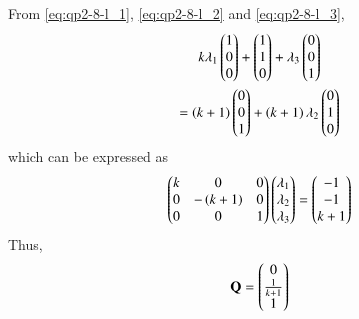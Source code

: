 \documentclass[journal,12pt,twocolumn]{IEEEtran}
\renewcommand\thesection{\arabic{section}}
\begin{document}
\begin{enumerate}[label=\thesection.\arabic*
,ref=\thesection.\theenumi]
From \eqref{eq:qp2-8-l_1}, \eqref{eq:qp2-8-l_2} and \eqref{eq:qp2-8-l_3},
\begin{multline}
k \lambda_1 \begin{pmatrix}1\\0\\0\end{pmatrix}
+\begin{pmatrix}1\\1\\0\end{pmatrix}+\lambda_3 \begin{pmatrix}0\\0\\1\end{pmatrix}
\\
=
\left(k+1\right) \begin{pmatrix}0\\0\\1\end{pmatrix}+\left(k+1\right)\lambda_2 \begin{pmatrix}0\\1\\0\end{pmatrix}
\end{multline}
%
which can be expressed as
\begin{align}
\begin{pmatrix}k & 0 & 0
\\
0 & -\left(k+1\right) & 0
\\
0 & 0 & 1
\end{pmatrix}
\begin{pmatrix}\lambda_1\\\lambda_2\\ \lambda_3\end{pmatrix}
=\begin{pmatrix}-1 \\ -1 \\ k+1\end{pmatrix}
\end{align}
%
Thus,
\begin{align}
\mathbf{Q} = \begin{pmatrix}0 \\\frac{1}{k+1} \\1\end{pmatrix}
\end{align}
\end{enumerate}
\end{document}
